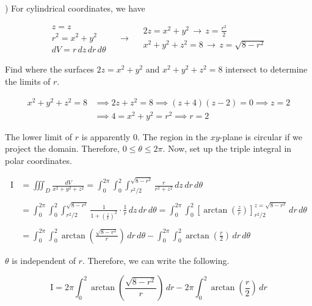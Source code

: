 \documentclass{article}
\begin{document}
\hfill

) For cylindrical coordinates, we have

\[
\begin{array}{c}
z=z\\
r^2=x^2+y^2\\
dV=r\,dz\,dr\,d\theta
\end{array}\quad\rightarrow\quad
\begin{array}{c}
\displaystyle2z=x^2+y^2\,\rightarrow\,z=\frac{r^2}2\\[0.3cm]
x^2+y^2+z^2=8\,\rightarrow\,z=\sqrt{8-r^2}\\
\end{array}
\]

\hfill

\noindent Find where the surfaces $2z=x^2+y^2$ and $x^2+y^2+z^2=8$ intersect to determine the limits of $r$.

\begin{align*}x^2+y^2+z^2=8&\implies 2z + z^2 = 8\implies (z+4)(z-2) = 0\implies z=2\\&\implies4=x^2+y^2=r^2 \implies r=2\end{align*}

\hfill

\noindent The lower limit of $r$ is apparently $0$. The region in the $xy$-plane is circular if we project the domain. Therefore, $0\leq\theta\leq2\pi$. Now, set up the triple integral in polar coordinates.

\begin{align*}\mathrm{I}&=\iiint_D\frac{dV}{x^2+y^2+z^2}=\int_0^{2\pi}\int_0^2\int_{r^2/2}^{\sqrt{8-r^2}}\frac{r}{r^2+z^2}\,dz\,dr\,d\theta\\\\&=\int_0^{2\pi}\int_0^2\int_{r^2/2}^{\sqrt{8-r^2}}\frac{1}{1+\left(\frac zr\right)^2}\cdot\frac1r\,dz\,dr\,d\theta=\int_0^{2\pi}\int_0^2\left[\arctan\left(\frac zr\right)\right]_{r^2/2}^{z=\sqrt{8-r^2}}\,dr\,d\theta\\\\&=\int_0^{2\pi}\int_0^2\arctan\left(\frac{\sqrt{8-r^2}}r\right)\,dr\,d\theta-\int_0^{2\pi}\int_0^2\arctan\left(\frac r2\right)\,dr\,d\theta\end{align*}

\hfill

\noindent $\theta$ is independent of $r$. Therefore, we can write the following.

\begin{equation}
\mathrm{I}=2\pi\int_0^2\arctan\left(\frac{\sqrt{8-r^2}}r\right)\,dr-2\pi\int_0^2\arctan\left(\frac r2\right)\,dr
\end{equation}
\end{document}
